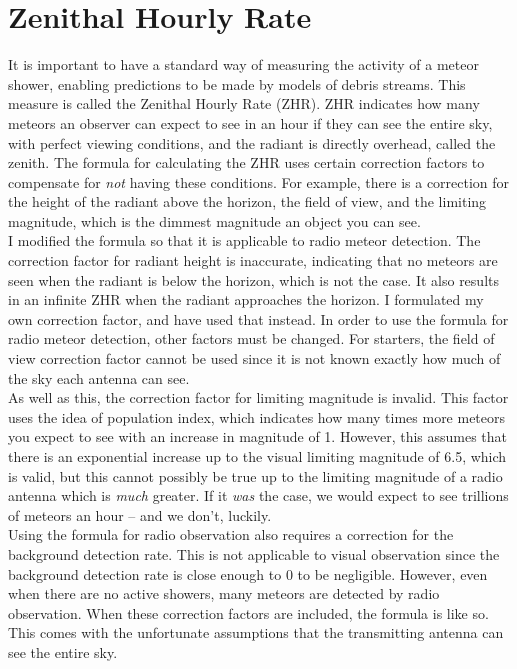 \documentclass[12pt]{article}
\begin{document}
\section{Zenithal Hourly Rate}

\large{
It is important to have a standard way of measuring the activity of a meteor
shower, enabling predictions to be made by models of debris streams. This
measure is called the Zenithal Hourly Rate (ZHR). ZHR indicates how many
meteors an observer can expect to see in an hour if they can see the entire
sky, with perfect viewing conditions, and the radiant is directly overhead,
called the zenith. The formula for calculating the ZHR uses certain correction
factors to compensate for {\it not} having these conditions. For example, there
is a correction for the height of the radiant above the horizon, the field of
view, and the limiting magnitude, which is the dimmest magnitude an object you
can see.\\

I modified the formula so that it is applicable to radio meteor detection. The
correction factor for radiant height is inaccurate, indicating that no meteors
are seen when the radiant is below the horizon, which is not the case. It also
results in an infinite ZHR when the radiant approaches the horizon. I
formulated my own correction factor, and have used that instead. In order to
use the formula for radio meteor detection, other factors must be changed. For
starters, the field of view correction factor cannot be used since it is not
known exactly how much of the sky each antenna can see.\\

As well as this, the correction factor for limiting magnitude is invalid. This
factor uses the idea of population index, which indicates how many times more
meteors you expect to see with an increase in magnitude of 1. However, this
assumes that there is an exponential increase up to the visual limiting
magnitude of 6.5, which is valid, but this cannot possibly be true up to the
limiting magnitude of a radio antenna which is {\it much} greater. If it {\it
was} the case, we would expect to see trillions of meteors an hour -- and we
don't, luckily.\\

Using the formula for radio observation also requires a correction for the
background detection rate. This is not applicable to visual observation since
the background detection rate is close enough to 0 to be negligible. However,
even when there are no active showers, many meteors are detected by radio
observation. When these correction factors are included, the formula is like
so.  This comes with the unfortunate assumptions that the transmitting antenna
can see the entire sky.\\

}
\end{document}
